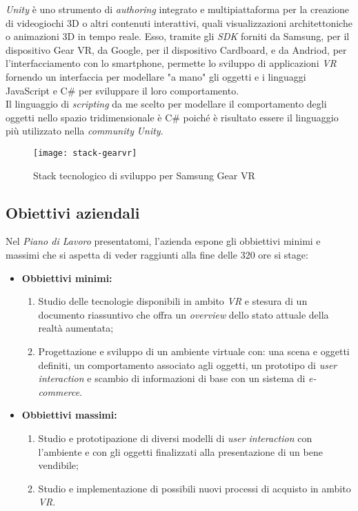 \textit{Unity} è uno strumento di \textit{authoring} integrato e multipiattaforma per la creazione di videogiochi 3D o altri contenuti interattivi, quali visualizzazioni architettoniche o animazioni 3D in tempo reale. Esso, tramite gli \textit{SDK} forniti da Samsung, per il dispositivo Gear VR, da Google, per il dispositivo Cardboard, e da Andriod, per l'interfacciamento con lo smartphone, permette lo sviluppo di applicazioni \textit{VR} fornendo un interfaccia per modellare "a mano" gli oggetti e i linguaggi JavaScript e C\# per sviluppare il loro comportamento. \\
Il linguaggio di \textit{scripting} da me scelto per modellare il comportamento degli oggetti nello spazio tridimensionale è C\# poiché è risultato essere il linguaggio più utilizzato nella \textit{community} \textit{Unity}.

\label{Stack Gear VR}
\begin{figure}[ht]
	\begin{center}
		\texttt{[image: stack-gearvr]}
		\caption{Stack tecnologico di sviluppo per Samsung Gear VR}
	\end{center}
\end{figure}
\FloatBarrier

\subsection{Obiettivi aziendali}

Nel \textit{Piano di Lavoro} presentatomi, l'azienda espone gli obbiettivi minimi e massimi che si aspetta di veder raggiunti alla fine delle 320 ore si stage:

\begin{itemize}
	\item \textbf{Obbiettivi minimi:}
	\begin{enumerate}
		\item Studio delle tecnologie disponibili in ambito \textit{VR} e stesura di un documento riassuntivo che offra un \textit{overview} dello stato attuale della realtà aumentata;
		\item Progettazione e sviluppo di un ambiente virtuale con: una scena e oggetti definiti, un comportamento associato agli oggetti, un prototipo di \textit{user interaction} e scambio di informazioni di base con un sistema di \textit{e-commerce}.
	\end{enumerate}
	\item \textbf{Obbiettivi massimi:}
	\begin{enumerate}
		\item Studio e prototipazione di diversi modelli di \textit{user interaction} con l'ambiente e con gli oggetti finalizzati alla presentazione di un bene vendibile;
		\item Studio e implementazione di possibili nuovi processi di acquisto in ambito \textit{VR}. 
	\end{enumerate}
\end{itemize}

